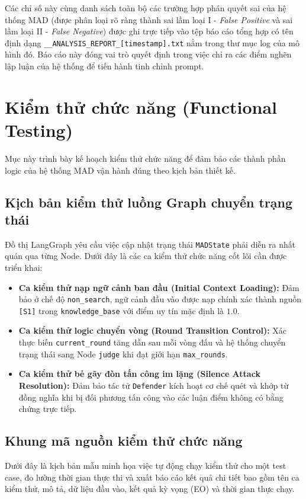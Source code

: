 \documentclass[12pt,a4paper]{report}
\begin{document}
Các chỉ số này cùng danh sách toàn bộ các trường hợp phán quyết sai của hệ thống MAD (được phân loại rõ ràng thành sai lầm loại I - \textit{False Positive} và sai lầm loại II - \textit{False Negative}) được ghi trực tiếp vào tệp báo cáo tổng hợp có tên định dạng \texttt{\_\_ANALYSIS\_REPORT\_[timestamp].txt} nằm trong thư mục log của mô hình đó. Báo cáo này đóng vai trò quyết định trong việc chỉ ra các điểm nghẽn lập luận của hệ thống để tiến hành tinh chỉnh prompt.

\section{Kiểm thử chức năng (Functional Testing)}
\label{sec:functional_testing}
Mục này trình bày kế hoạch kiểm thử chức năng để đảm bảo các thành phần logic của hệ thống MAD vận hành đúng theo kịch bản thiết kế.

\subsection{Kịch bản kiểm thử luồng Graph chuyển trạng thái}
Đồ thị LangGraph yêu cầu việc cập nhật trạng thái \texttt{MADState} phải diễn ra nhất quán qua từng Node. Dưới đây là các ca kiểm thử chức năng cốt lõi cần được triển khai:
\begin{itemize}
    \item \textbf{Ca kiểm thử nạp ngữ cảnh ban đầu (Initial Context Loading):} Đảm bảo ở chế độ \texttt{non\_search}, ngữ cảnh đầu vào được nạp chính xác thành nguồn \texttt{[S1]} trong \texttt{knowledge\_base} với điểm uy tín mặc định là $1.0$.
    \item \textbf{Ca kiểm thử logic chuyển vòng (Round Transition Control):} Xác thực biến \texttt{current\_round} tăng dần sau mỗi vòng đấu và hệ thống chuyển trạng thái sang Node \texttt{judge} khi đạt giới hạn \texttt{max\_rounds}.
    \item \textbf{Ca kiểm thử bẻ gãy đòn tấn công im lặng (Silence Attack Resolution):} Đảm bảo tác tử \texttt{Defender} kích hoạt cơ chế quét và khớp từ đồng nghĩa khi bị đối phương tấn công vào các luận điểm không có bằng chứng trực tiếp.
\end{itemize}

\subsection{Khung mã nguồn kiểm thử chức năng}
Dưới đây là kịch bản mẫu minh họa việc tự động chạy kiểm thử cho một test case, đo lường thời gian thực thi và xuất báo cáo kết quả chi tiết bao gồm tên ca kiểm thử, mô tả, dữ liệu đầu vào, kết quả kỳ vọng (EO) và thời gian thực chạy.
\end{document}
